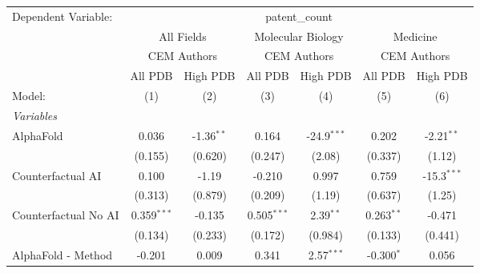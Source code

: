 \begingroup
\centering
\begin{tabular}{lcccccc}
   \tabularnewline \midrule \midrule
   Dependent Variable: & \multicolumn{6}{c}{patent\_count}\\
 & \multicolumn{2}{c}{All Fields} & \multicolumn{2}{c}{Molecular Biology} & \multicolumn{2}{c}{Medicine} \\
\cmidrule(lr){2-3} \cmidrule(lr){4-5} \cmidrule(lr){6-7}
 & \multicolumn{2}{c}{CEM Authors} & \multicolumn{2}{c}{CEM Authors} & \multicolumn{2}{c}{CEM Authors} \\
\cmidrule(lr){2-3} \cmidrule(lr){4-5} \cmidrule(lr){6-7}
 & \multicolumn{1}{c}{All PDB} & \multicolumn{1}{c}{High PDB} & \multicolumn{1}{c}{All PDB} & \multicolumn{1}{c}{High PDB} & \multicolumn{1}{c}{All PDB} & \multicolumn{1}{c}{High PDB} \\
\cmidrule(lr){2-2} \cmidrule(lr){3-3} \cmidrule(lr){4-4} \cmidrule(lr){5-5} \cmidrule(lr){6-6} \cmidrule(lr){7-7}
   Model:                                                     & (1)           & (2)           & (3)            & (4)           & (5)           & (6)\\  
   \midrule
   \emph{Variables}\\
   AlphaFold                                                  & 0.036         & -1.36$^{**}$  & 0.164          & -24.9$^{***}$ & 0.202         & -2.21$^{**}$\\   
                                                              & (0.155)       & (0.620)       & (0.247)        & (2.08)        & (0.337)       & (1.12)\\   
   Counterfactual AI                                          & 0.100         & -1.19         & -0.210         & 0.997         & 0.759         & -15.3$^{***}$\\   
                                                              & (0.313)       & (0.879)       & (0.209)        & (1.19)        & (0.637)       & (1.25)\\   
   Counterfactual No AI                                       & 0.359$^{***}$ & -0.135        & 0.505$^{***}$  & 2.39$^{**}$   & 0.263$^{**}$  & -0.471\\   
                                                              & (0.134)       & (0.233)       & (0.172)        & (0.984)       & (0.133)       & (0.441)\\   
   AlphaFold - Method                                         & -0.201        & 0.009         & 0.341          & 2.57$^{***}$  & -0.300$^{*}$  & 0.056\\   

\end{tabular}

